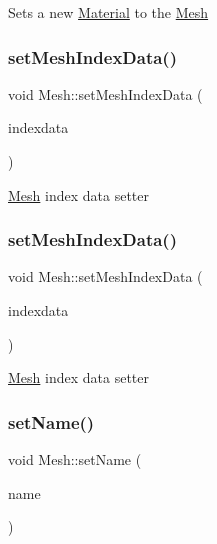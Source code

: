 Sets a new \hyperlink{classMaterial}{Material} to the \hyperlink{classMesh}{Mesh} \mbox{\label{classMesh_ab9bbc073beb34fd8bd5b5b0f973a4fe2}} 
\subsubsection{\texorpdfstring{set\+Mesh\+Index\+Data()}{setMeshIndexData()}\hspace{0.1cm}{\footnotesize\ttfamily [1/2]}}
{\footnotesize\ttfamily void Mesh\+::set\+Mesh\+Index\+Data (\begin{DoxyParamCaption}\item[{\hyperlink{classMeshIndexData}{Mesh\+Index\+Data} $\ast$}]{indexdata }\end{DoxyParamCaption})}

\hyperlink{classMesh}{Mesh} index data setter \mbox{\label{classMesh_ab9bbc073beb34fd8bd5b5b0f973a4fe2}} 
\subsubsection{\texorpdfstring{set\+Mesh\+Index\+Data()}{setMeshIndexData()}\hspace{0.1cm}{\footnotesize\ttfamily [2/2]}}
{\footnotesize\ttfamily void Mesh\+::set\+Mesh\+Index\+Data (\begin{DoxyParamCaption}\item[{\hyperlink{classMeshIndexData}{Mesh\+Index\+Data} $\ast$}]{indexdata }\end{DoxyParamCaption})}

\hyperlink{classMesh}{Mesh} index data setter \mbox{\label{classMesh_ab944b018efbf265dc7555d793e50b4fd}} 
\subsubsection{\texorpdfstring{set\+Name()}{setName()}\hspace{0.1cm}{\footnotesize\ttfamily [1/2]}}
{\footnotesize\ttfamily void Mesh\+::set\+Name (\begin{DoxyParamCaption}\item[{const std\+::string \&}]{name }\end{DoxyParamCaption})\hspace{0.3cm}{\ttfamily [inline]}}

